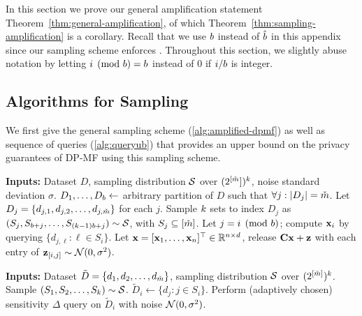 \documentclass{article}
\begin{document}
In this section we prove our general amplification statement Theorem~\ref{thm:general-amplification}, of which Theorem~\ref{thm:sampling-amplification} is a corollary. Recall that we use $b$ instead of $\hat{b}$ in this appendix since our sampling scheme enforces \multiepochpart. Throughout this section, we slightly abuse notation by letting $i \pmod {b} = b$ instead of $0$ if $i / b$ is integer. 

\subsection{Algorithms for Sampling}\label{sec:amplification-algorithms}

We first give the general sampling scheme (\cref{alg:amplified-dpmf}) as well as sequence of queries (\cref{alg:queryub}) that provides an upper bound on the privacy guarantees of DP-MF using this sampling scheme.

\begin{algorithm}[H]
\caption{Sampling scheme for banded DP-MF} \label{alg:amplified-dpmf}
\begin{algorithmic}%
\State \textbf{Inputs:} Dataset $D$, sampling distribution $\mathcal{S}$ over $(2^{[\check{m}}])^{k}$, noise standard deviation $\sigma$.
\State $D_1, \ldots, D_{b} \leftarrow$ arbitrary partition of $D$ such that $\forall j: |D_j|  = \check{m} $.
\State Let $D_j = \{d_{j,1}, d_{j,2}, \ldots, d_{j,\check{m}}\}$ for each $j$. 
  \State Sample $k$ sets to index $D_j$ as $(S_j, S_{b+j}, \ldots, S_{(k - 1)b + j}) \sim \mathcal{S}$, with $S_j \subseteq [\check{m}]$.
\EndFor
{}
\State Let $j = i \pmod {b}$; compute $\mathbf{x}_i$ by querying $\{d_{j,\ell}: \ell \in S_i\}$.
\EndFor
\State Let $\mathbf{x} = [\mathbf{x}_1, \dots, \mathbf{x}_n]^\top \in \mathbb{R}^{n \times d}$, release $\mathbf{C} \mathbf{x} + \mathbf{z}$ with each entry of $\mathbf{z}_{[i, j]} \sim \mathcal{N}(0, \sigma^2)$.
\end{algorithmic}
\end{algorithm}

\begin{algorithm}[H]
\caption{Sequence of queries that bounds privacy of \cref{alg:amplified-dpmf}} \label{alg:queryub}
\begin{algorithmic}%
\State \textbf{Inputs:} Dataset $\tilde{D} = \{d_1, d_2, \ldots, d_{\check{m}}\}$, sampling distribution $\mathcal{S}$ over $(2^{[\check{m}]})^{k}$.
\State Sample $(S_1, S_2, \ldots, S_{k}) \sim \mathcal{S}$.
\State $\tilde{D}_i \leftarrow \{d_j: j \in S_i\}$.
\State Perform (adaptively chosen) sensitivity $\Delta$ query on $\tilde{D}_i$ with noise $\mathcal{N}(0, \sigma^2)$.
\EndFor
\end{algorithmic}
\end{algorithm}
\end{document}
